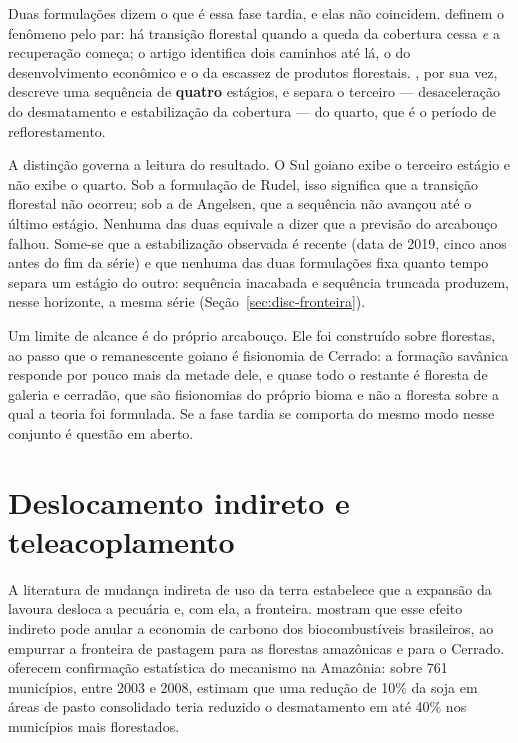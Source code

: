 Duas formulações dizem o que é essa fase tardia, e elas não coincidem.
 definem o fenômeno pelo par: há transição
florestal quando a queda da cobertura cessa \emph{e} a recuperação começa; o
artigo identifica dois caminhos até lá, o do desenvolvimento econômico e o da
escassez de produtos florestais. , por sua vez,
descreve uma sequência de \textbf{quatro} estágios, e separa o terceiro ---
desaceleração do desmatamento e estabilização da cobertura --- do quarto, que
é o período de reflorestamento.

A distinção governa a leitura do resultado. O Sul goiano exibe o terceiro
estágio e não exibe o quarto. Sob a formulação de Rudel, isso significa que a
transição florestal não ocorreu; sob a de Angelsen, que a sequência não
avançou até o último estágio. Nenhuma das duas equivale a dizer que a previsão
do arcabouço falhou. Some-se que a estabilização observada é recente (data
de 2019, cinco anos antes do fim da série) e que nenhuma das duas
formulações fixa quanto tempo separa um estágio do outro: sequência inacabada
e sequência truncada produzem, nesse horizonte, a mesma série
(Seção~\ref{sec:disc-fronteira}).

Um limite de alcance é do próprio arcabouço. Ele foi construído sobre
florestas, ao passo que o remanescente goiano é fisionomia de Cerrado: a
formação savânica responde por pouco mais da metade dele, e quase todo o
restante é floresta de galeria e cerradão, que são fisionomias do próprio
bioma e não a floresta sobre a qual a teoria foi formulada. Se a fase tardia
se comporta do mesmo modo nesse conjunto é questão em aberto.

\section{Deslocamento indireto e teleacoplamento}
\label{sec:ref-iluc}

A literatura de mudança indireta de uso da terra estabelece que a expansão da
lavoura desloca a pecuária e, com ela, a fronteira.
 mostram que esse efeito indireto pode anular a
economia de carbono dos biocombustíveis brasileiros, ao empurrar a fronteira
de pastagem para as florestas amazônicas e para o Cerrado.
 oferecem confirmação estatística do mecanismo na
Amazônia: sobre 761 municípios, entre 2003 e 2008, estimam que uma redução de
10\% da soja em áreas de pasto consolidado teria reduzido o desmatamento em
até 40\% nos municípios mais florestados.

